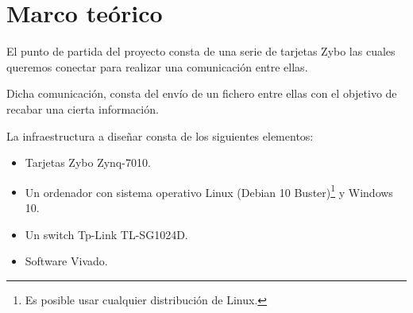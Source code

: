 \section{Marco teórico}
El punto de partida del proyecto consta de una serie de tarjetas Zybo las cuales queremos conectar para realizar una comunicación entre ellas.

Dicha comunicación, consta del envío de un fichero entre ellas con el objetivo de recabar una cierta información.

La infraestructura a diseñar consta de los siguientes elementos:
\begin{itemize}
	\item Tarjetas Zybo Zynq-7010.
	\item Un ordenador con sistema operativo Linux (Debian 10 Buster)\footnote{Es posible usar cualquier distribución de Linux.} y Windows 10.
	\item Un switch Tp-Link TL-SG1024D.
	\item Software Vivado.
\end{itemize}